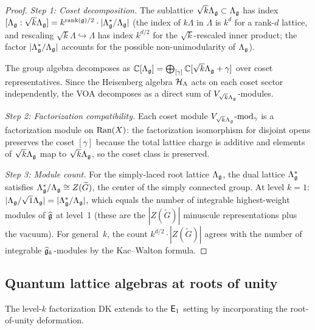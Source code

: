 \begin{proof}
\emph{Step 1: Coset decomposition.}
The sublattice $\sqrt{k}\Lambda_{\mathfrak{g}} \subset \Lambda_{\mathfrak{g}}$ has
index $[\Lambda_{\mathfrak{g}} : \sqrt{k}\Lambda_{\mathfrak{g}}] =
k^{\operatorname{rank}(\mathfrak{g})/2} \cdot |\Lambda_{\mathfrak{g}}^*/\Lambda_{\mathfrak{g}}|$
(the index of $k\Lambda$ in $\Lambda$ is $k^d$ for a rank-$d$
lattice, and rescaling $\sqrt{k}\Lambda \hookrightarrow \Lambda$
has index $k^{d/2}$ for the $\sqrt{k}$-rescaled inner product;
the factor $|\Lambda_{\mathfrak{g}}^*/\Lambda_{\mathfrak{g}}|$ accounts for the
possible non-unimodularity of $\Lambda_{\mathfrak{g}}$).

The group algebra decomposes as
$\mathbb{C}[\Lambda_{\mathfrak{g}}] =
\bigoplus_{[\gamma]} \mathbb{C}[\sqrt{k}\Lambda_{\mathfrak{g}} + \gamma]$
over coset representatives.  Since the Heisenberg algebra
$\mathcal{H}_\Lambda$ acts on each coset sector independently, the VOA
decomposes as a direct sum of $V_{\sqrt{k}\Lambda_{\mathfrak{g}}}$-modules.

\emph{Step 2: Factorization compatibility.}
Each coset module
$V_{\sqrt{k}\Lambda_{\mathfrak{g}}}\text{-mod}_\gamma$ is a
factorization module on $\operatorname{Ran}(X)$: the factorization isomorphism
for disjoint opens preserves the coset $[\gamma]$ because the
total lattice charge is additive and elements of
$\sqrt{k}\Lambda_{\mathfrak{g}}$ map to $\sqrt{k}\Lambda_{\mathfrak{g}}$, so the coset
class is preserved.

\emph{Step 3: Module count.}
For the simply-laced root lattice $\Lambda_{\mathfrak{g}}$, the dual lattice
$\Lambda_{\mathfrak{g}}^*$ satisfies
$\Lambda_{\mathfrak{g}}^*/\Lambda_{\mathfrak{g}} \cong Z(\widetilde{G})$, the center of
the simply connected group.  At level $k = 1$:
$|\Lambda_{\mathfrak{g}}/\sqrt{1}\Lambda_{\mathfrak{g}}| = |\Lambda_{\mathfrak{g}}^*/\Lambda_{\mathfrak{g}}|$,
which equals the number of integrable highest-weight modules of
$\widehat{\mathfrak{g}}$ at level~1 (these are the $|Z(\widetilde{G})|$
minuscule representations plus the vacuum).  For general~$k$, the
count $k^{d/2} \cdot |Z(\widetilde{G})|$ agrees with the number
of integrable $\widehat{\mathfrak{g}}_k$-modules by the Kac--Walton
formula.
\end{proof}


\subsection{Quantum lattice algebras at roots of unity}

The level-$k$ factorization DK extends to the $\mathsf{E}_1$ setting
by incorporating the root-of-unity deformation.

